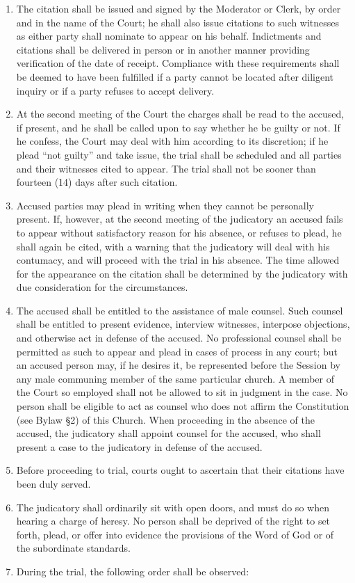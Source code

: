 \documentclass[
]{book}
\begin{document}
\begin{enumerate}
\item
  The citation shall be issued and signed by the Moderator or Clerk, by order and in the name of the Court; he shall also issue citations to such witnesses as either party shall nominate to appear on his behalf. Indictments and citations shall be delivered in person or in another manner providing verification of the date of receipt. Compliance with these requirements shall be deemed to have been fulfilled if a party cannot be located after diligent inquiry or if a party refuses to accept delivery.
\item
  At the second meeting of the Court the charges shall be read to the accused, if present, and he shall be called upon to say whether he be guilty or not. If he confess, the Court may deal with him according to its discretion; if he plead ``not guilty'' and take issue, the trial shall be scheduled and all parties and their witnesses cited to appear. The trial shall not be sooner than fourteen (14) days after such citation.
\item
  Accused parties may plead in writing when they cannot be personally present. If, however, at the second meeting of the judicatory an accused fails to appear without satisfactory reason for his absence, or refuses to plead, he shall again be cited, with a warning that the judicatory will deal with his contumacy, and will proceed with the trial in his absence. The time allowed for the appearance on the citation shall be determined by the judicatory with due consideration for the circumstances.
\item
  The accused shall be entitled to the assistance of male counsel. Such counsel shall be entitled to present evidence, interview witnesses, interpose objections, and otherwise act in defense of the accused. No professional counsel shall be permitted as such to appear and plead in cases of process in any court; but an accused person may, if he desires it, be represented before the Session by any male communing member of the same particular church. A member of the Court so employed shall not be allowed to sit in judgment in the case. No person shall be eligible to act as counsel who does not affirm the Constitution (see Bylaw §2) of this Church. When proceeding in the absence of the accused, the judicatory shall appoint counsel for the accused, who shall present a case to the judicatory in defense of the accused.
\item
  Before proceeding to trial, courts ought to ascertain that their citations have been duly served.
\item
  The judicatory shall ordinarily sit with open doors, and must do so when hearing a charge of heresy. No person shall be deprived of the right to set forth, plead, or offer into evidence the provisions of the Word of God or of the subordinate standards.
\item
  During the trial, the following order shall be observed:


\end{enumerate}
\end{document}

